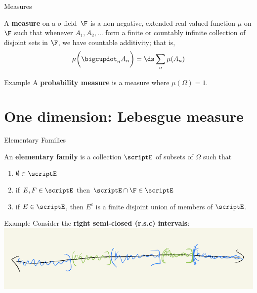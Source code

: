 \documentclass[10pt]{beamer}
\renewcommand{\sf}{$\sigma$-field}
\begin{document}
\begin{frame}{Measures}	
\begin{definition}
A \textbf{measure} on a \sf~$\F$ is a non-negative, extended real-valued function $\mu$ on $\F$ such that whenever $A_1, A_2, ...$ form a finite or countably infinite collection of disjoint sets in $\F$, we have \alert{countable additivity}; that is,
\[ \mu \bigg( \bigcupdot_n A_n \bigg) = \ds\sum_n \mu(A_n) \]
\label{def:measure}	
\end{definition}

\pause 
\begin{block}{Example}
A \textbf{probability measure} is a measure where $\mu(\Omega)=1$.		
\end{block}
\end{frame}

\section{One dimension: Lebesgue measure}

\begin{frame}{Elementary Families}

\begin{definition}
An \textbf{elementary family} is a collection $\scriptE$ of subsets of $\Omega$ such that 
\begin{enumerate}
\item $\emptyset \in \scriptE$
\item if $E,F \in \scriptE$ then $\scriptE \cap \F \in \scriptE$
\item if $E \in \scriptE$, then $E^c$ is a finite disjoint union of members of $\scriptE$.	
\end{enumerate}
\label{def:elementary_family}
\end{definition}

\begin{block}{Example}
Consider the \textbf{right semi-closed (r.s.c) intervals}:
\centering
\includegraphics[width=.8\textwidth]{images/rsc_intervals}
\end{block}	
\end{frame}
\end{document}
